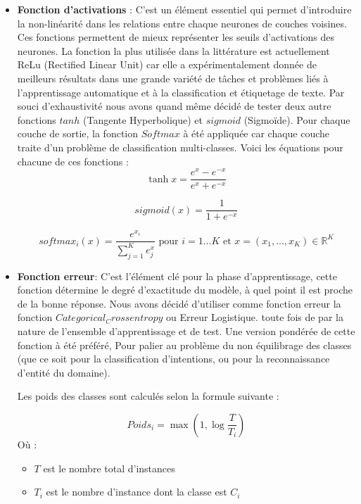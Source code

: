 \begin{itemize}
		\item \textbf{Fonction d'activations} : 
		C'est un élément essentiel qui permet d'introduire la non-linéarité dans les relations entre chaque neurones de couches voisines. Ces fonctions permettent de mieux représenter les seuils d'activations des neurones. La fonction la plus utilisée dans la littérature est actuellement ReLu (Rectified Linear Unit) car elle a expérimentalement donnée de meilleurs résultats dans une grande variété de tâches et problèmes liés à l'apprentissage automatique et à la classification et étiquetage de texte. Par souci d'exhaustivité nous avons quand même décidé de tester deux autre fonctions $tanh$ (Tangente Hyperbolique) et $sigmoid$ (Sigmoïde). Pour chaque couche de sortie, la fonction $Softmax$ à été appliquée car chaque couche traite d'un problème de classification multi-classes. Voici les équations pour chacune de ces fonctions :
		\begin{equation*}
			\tanh{x} = \frac{e^{x}-e^{-x}}{e^x+e^{-x}}
		\end{equation*}
		
		\begin{equation*}
			sigmoid(x) = \frac{1}{1+e^{-x}}
		\end{equation*}
		
		\begin{equation*}
			softmax_i(x) = \frac{e^{x_i}}{\sum_{j=1}^{K}e{^x_j}} \text{ pour } i=1...K \text{ et } x=(x_1,...,x_K) \in \mathbb{R}^K
		\end{equation*}
		\item \textbf{Fonction erreur}:
		C'est l'élément clé pour la phase d'apprentissage, cette fonction détermine le degré d'exactitude du modèle, à quel point il est proche de la bonne réponse. Nous avons décidé d'utiliser comme fonction erreur la fonction $Categorical_Crossentropy$ ou Erreur Logistique. toute fois de par la nature de l'ensemble d'apprentissage et de test. Une version pondérée de cette fonction à été préféré, Pour palier au problème du non équilibrage des classes (que ce soit pour la classification d'intentions, ou pour la reconnaissance d'entité du domaine).
		\par
		Les poids des classes sont calculés selon la formule suivante : 
		
		\begin{equation*}
			Poids_i = \max(1,\log{\frac{T}{T_i}})
		\end{equation*}
		Où :
		\begin{itemize}
			\item  $T$ est le nombre total d'instances
			\item  $T_i$ est le nombre d'instance dont la classe est $C_i$
		\end{itemize}
		

\end{itemize}
